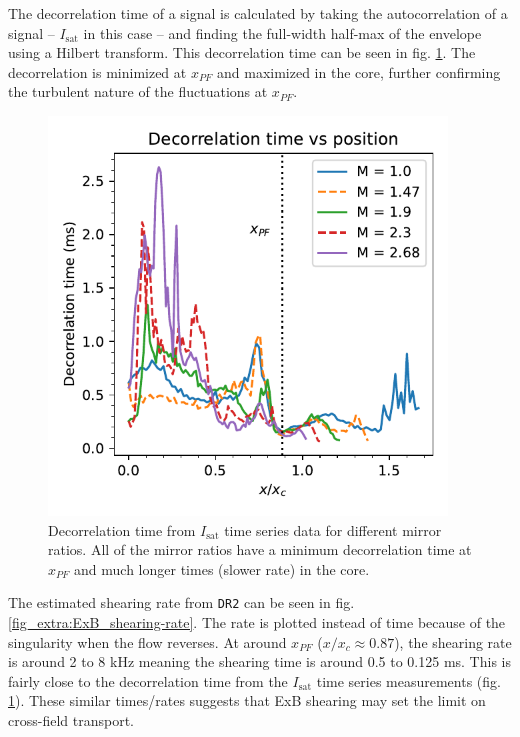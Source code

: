 The decorrelation time of a signal is calculated by taking the autocorrelation of a signal -- $I_\text{sat}$ in this case -- and finding the full-width half-max of the envelope using a Hilbert transform. This decorrelation time can be seen in fig. \ref{fig_extra:decorrelation_time}. The decorrelation is minimized  at $x_{PF}$ and maximized in the core, further confirming the turbulent nature of the fluctuations at $x_{PF}$.
\begin{figure}
    \centering
    \includegraphics[width=300pt]{figures/extra/decorrelation_time.pdf}
    \caption[$I_\text{sat}$ decorrelation time]{Decorrelation time from $I_\text{sat}$ time series data for different mirror ratios. All of the mirror ratios have a minimum decorrelation time at $x_{PF}$ and much longer times (slower rate) in the core.}
    \label{fig_extra:decorrelation_time}
\end{figure}

The estimated shearing rate from \texttt{DR2} can be seen in fig. \ref{fig_extra:ExB_shearing-rate}. The rate is plotted instead of time because of the singularity when the flow reverses. At around $x_{PF}$ ($x/x_c \approx 0.87$), the shearing rate is around 2 to 8 kHz meaning the shearing time is around 0.5 to 0.125 ms. This is fairly close to the decorrelation time from the $I_\text{sat}$ time series measurements (fig. \ref{fig_extra:decorrelation_time}). These similar times/rates suggests that ExB shearing may set the limit on cross-field transport.

